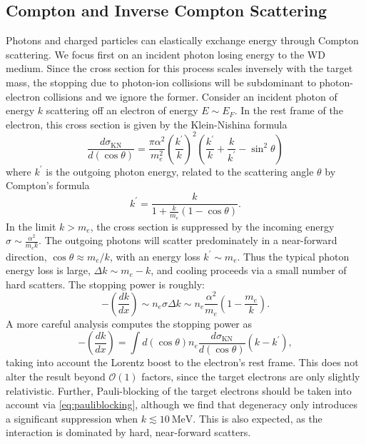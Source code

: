 \documentclass[twocolumn,showpacs,preprintnumbers,amsmath,amssymb,prd]{revtex4}
\newcommand{\OO}{\mathcal{O}}
\def\r{\right)}
\def\l{\left(}
\begin{document}
\begin{appendices}
\subsection*{Compton and Inverse Compton Scattering}
Photons and charged particles can elastically exchange energy through Compton scattering.
We focus first on an incident photon losing energy to the WD medium.
Since the cross section for this process scales inversely with the target mass, the stopping due to photon-ion collisions will be subdominant to photon-electron collisions and we ignore the former. 
Consider an incident photon of energy $k$ scattering off an electron of energy $E \sim E_F$.
In the rest frame of the electron, this cross section is given by the Klein-Nishina formula
\begin{equation}
\label{KN}
  \frac{d\sigma_\text{KN}}{d (\cos \theta)} = \frac{\pi \alpha^2}{m_e^2} 
  \l \frac{k^\prime}{k} \r^2 
  \l \frac{k^\prime}{k} + \frac{k}{k^\prime} -\sin^2 \theta \r
\end{equation}
where $k^\prime$ is the outgoing photon energy, related to the scattering angle $\theta$ by Compton's formula
\begin{equation}
{k^{\prime }={\frac {k}{1+{\frac {k}{m_e}}(1-\cos \theta )}}}.
\end{equation}
In the limit $k > m_e$, the cross section is suppressed by the incoming energy $\sigma \sim \frac{\alpha^2}{m_e k}$. 
The outgoing photons will scatter predominately in a near-forward direction, $\cos \theta \approx m_e/k$, with an energy loss $k^\prime \sim m_e$.
Thus the typical photon energy loss is large, $\Delta k \sim m_e - k$, and cooling proceeds via a small number of hard scatters.
The stopping power is roughly:
\begin{equation}
\label{eq:approx-comptonSP}
  - \l\frac{dk}{dx}\r \sim n_e \sigma \Delta{k} 
  \sim n_e \frac{\alpha^2}{m_e} \l 1 - \frac{m_e}{k} \r.
\end{equation}
A more careful analysis computes the stopping power as 
\begin{equation}
\label{eq:comptonSP}
  -\l\frac{dk}{dx}\r =  \int d (\cos \theta) n_e \frac{d\sigma_\text{KN}}{d (\cos \theta)} \l k - k^\prime \r, 
\end{equation}
taking into account the Lorentz boost to the electron's rest frame.
This does not alter the result beyond $\OO(1)$ factors, since the target electrons are only slightly relativistic.
Further, Pauli-blocking of the target electrons should be taken into account via \eqref{eq:pauliblocking}, although we find that degeneracy only introduces a significant suppression when $k \lesssim 10 ~\text{MeV}$.
This is also expected, as the interaction is dominated by hard, near-forward scatters.


\end{appendices}
\end{document}
